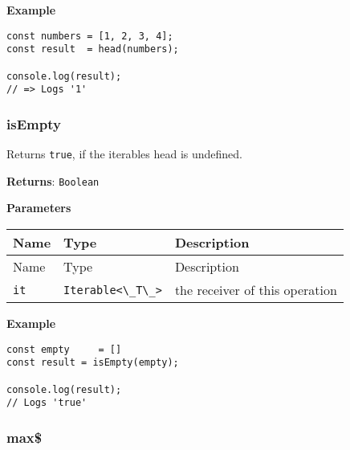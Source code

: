 \textbf{Example}

\begin{lstlisting}[label=52bff184-a4bc-4651-9a65-eace96baeaa5]
const numbers = [1, 2, 3, 4];
const result  = head(numbers);
                              
console.log(result);
// => Logs '1'
\end{lstlisting}

\hypertarget{4f9c8f02-8045-4c55-980b-19761e4a0c5c}{%
\subsubsection{isEmpty}\label{4f9c8f02-8045-4c55-980b-19761e4a0c5c}}

Returns \passthrough{\lstinline!true!}, if the iterables head is
undefined.

\textbf{Returns}: \passthrough{\lstinline!Boolean!}

\textbf{Parameters}

\begin{longtable}[]{
  >{\raggedright\arraybackslash}p{}
  >{\raggedright\arraybackslash}p{}
  >{\raggedright\arraybackslash}p{}@{}}

\toprule\noalign{}
Name & Type & Description \\
\midrule\noalign{}
\endfirsthead
\toprule\noalign{}
Name & Type & Description \\
\midrule\noalign{}
\endhead
\bottomrule\noalign{}
\endlastfoot
\passthrough{\lstinline!it!} & \passthrough{\lstinline!Iterable<\_T\_>!}
& the receiver of this operation \\
\end{longtable}

\textbf{Example}

\begin{lstlisting}[label=636c2abf-60c6-4c38-a240-b51fa06f74b1]
const empty     = []
const result = isEmpty(empty);
                              
console.log(result);
// Logs 'true'
\end{lstlisting}

\hypertarget{f5d04902-359f-4b27-b811-851551c0d1fe}{%
\subsubsection{max\$}\label{f5d04902-359f-4b27-b811-851551c0d1fe}}

